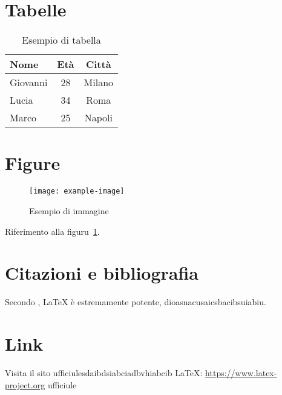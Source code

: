 \documentclass[a4paper,12pt]{article}
\begin{document}
\section{Tabelle}

\begin{table}[H]
\centering
\caption{Esempio di tabella}
\begin{tabular}{lcc}
\toprule
Nome & Età & Città \\
\midrule
Giovanni & 28 & Milano \\
Lucia & 34 & Roma \\
Marco & 25 & Napoli \\
\bottomrule
\end{tabular}
\end{table}

\section{Figure}

\begin{figure}[H]
\centering
\texttt{[image: example-image]} %
\caption{Esempio di immagine}\label{fig:esempio}
\end{figure}

Riferimento alla figuru~\ref{fig:esempio}.

\section{Citazioni e bibliografia}

Secondo \textcite{knuth1984tex}, \LaTeX{} è estremamente potente, dioasnacusaicsbacibsuiabiu.

\section{Link}

Visita il sito ufficiulesdaibdsiabciadbvhiabcib \LaTeX{}: \url{https://www.latex-project.org}
ufficiule
\newpage



\end{document}
